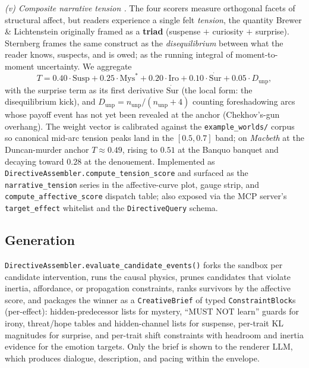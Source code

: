 \documentclass[11pt]{article}
\begin{document}
\emph{(v) Composite narrative tension
\citep{brewer1982stories,sternberg1978expositional,vorderer1996suspense}.}
The four scorers measure orthogonal facets of structural affect,
but readers experience a single felt \emph{tension}, the quantity
Brewer \& Lichtenstein originally framed as a \textbf{triad}
(suspense $+$ curiosity $+$ surprise). Sternberg frames the same
construct as the \emph{disequilibrium} between what the reader
knows, suspects, and is owed; \citet{vorderer1996suspense} as
the running integral of moment-to-moment uncertainty. We
aggregate
\begin{equation}
\label{eq:tension}
T = 0.40 \cdot \mathrm{Susp} + 0.25 \cdot \mathrm{Mys}^{*} + 0.20 \cdot \mathrm{Iro} + 0.10 \cdot \dot{\mathrm{Sur}} + 0.05 \cdot D_{\mathrm{unp}},
\end{equation}
with the surprise term as its first derivative
$\dot{\mathrm{Sur}}$ (the local form: the disequilibrium kick),
and
$D_{\mathrm{unp}} = n_{\mathrm{unp}} / (n_{\mathrm{unp}} + 4)$
counting foreshadowing arcs whose payoff event has not yet been
revealed at the anchor (Chekhov's-gun overhang). The weight
vector is calibrated against the \texttt{example\_worlds/}
corpus so canonical mid-arc tension peaks land in the
$[0.5, 0.7]$ band; on \emph{Macbeth} at the Duncan-murder
anchor $T \approx 0.49$, rising to $0.51$ at the Banquo banquet
and decaying toward $0.28$ at the denouement. Implemented as
\texttt{DirectiveAssembler.compute\_tension\_score} and surfaced
as the \texttt{narrative\_tension} series in the affective-curve
plot, gauge strip, and \texttt{compute\_affective\_score}
dispatch table; also exposed via the MCP server's
\texttt{target\_effect} whitelist and the
\texttt{DirectiveQuery} schema.

\subsection{Generation}
\label{app:generation}

\texttt{DirectiveAssembler.evaluate\_candidate\_events()} forks the
sandbox per candidate intervention, runs the causal physics, prunes
candidates that violate inertia, affordance, or propagation
constraints, ranks survivors by the affective score, and packages
the winner as a \texttt{CreativeBrief} of typed
\texttt{ConstraintBlock}s (per-effect): hidden-predecessor lists for
mystery, ``MUST NOT learn'' guards for irony, threat/hope tables and
hidden-channel lists for suspense, per-trait KL magnitudes for
surprise, and per-trait shift constraints with headroom and inertia
evidence for the emotion targets. Only the brief is shown to the
renderer LLM, which produces dialogue, description, and pacing
within the envelope.
\end{document}
